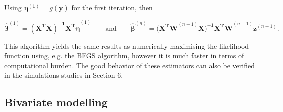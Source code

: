 \documentclass[useAMS,referee]{biom}
\begin{document}
Using $\boldsymbol{\eta^{(1)}} = g(\mathbf{y})$ for the first iteration, then



\begin{equation}\label{estimatorregression}
\hat{\boldsymbol{\beta}}^{(1)}= \mathbf{(X^{T}X)^{-1} X^{T}\boldsymbol{\eta}}^{(1)}\qquad \mbox{and} \qquad \hat{\boldsymbol{\beta}}^{(n)} = \mathbf{(X^{T}W}^{(n-1)}\mathbf{X)^{-1} X^{T}W}^{(n-1)}\textbf{z}^{(n-1)}.
\end{equation}

This algorithm yields the same results as numerically maximising the likelihood function using, e.g. the BFGS algorithm, however it is much faster in terms of computational burden. The good behavior of these estimators can also be verified in the simulations studies in Section 6.







\subsection{Bivariate modelling}
\end{document}
